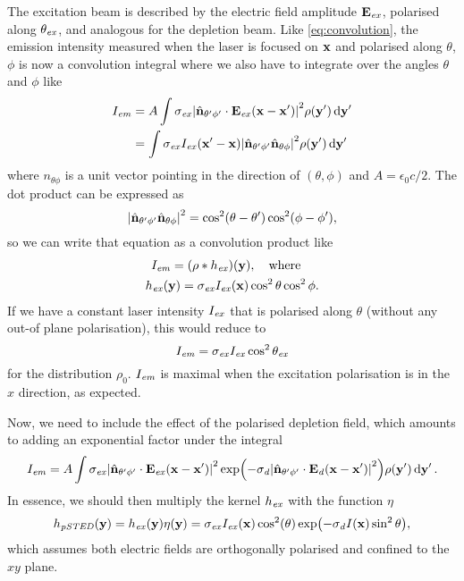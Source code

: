 The excitation beam is described by the electric field amplitude $ \vb{E}_{\mathit{ex}} $, polarised along $ \theta_{\mathit{ex}} $, and analogous for the depletion beam. Like \autoref{eq:convolution}, the emission intensity measured when the laser is focused on $ \vb{x} $ and polarised along $ \theta $, $ \phi $ is now a convolution integral where we also have to integrate over the angles $ \theta $ and $ \phi $ like
\begin{equation}
	\begin{aligned}
		I_{\mathit{em}} 
			&= A \int 
				\sigma_{\mathit{ex}} \abs{\hat{\vb{n}}_{\theta'\phi'} \cdot \vb{E}_{\mathit{ex}}(\vb{x}-\vb{x}')}^2 
				\rho(\vb{y}') 
				\dd{\vb{y}'} \\
			&= \int 
				\sigma_{\mathit{ex}} I_{\mathit{ex}}(\vb{x}'-\vb{x}) \abs{\hat{\vb{n}}_{\theta'\phi'}\hat{\vb{n}}_{\theta\phi}}^2
				\rho(\vb{y}') 
				\dd{\vb{y}'}
	\end{aligned}
\end{equation}
where $ \unit{n}_{\theta\phi} $ is a unit vector pointing in the direction of $ (\theta, \phi) $ and $ A = \epsilon_0c/2 $. The dot product can be expressed as
\begin{equation}
	\abs{\hat{\vb{n}}_{\theta'\phi'}\hat{\vb{n}}_{\theta\phi}}^2 = \cos^2(\theta-\theta') \cos^2(\phi-\phi'),
\end{equation}
so we can write that equation as a convolution product like
\begin{gather}
	I_\emm = (\rho*h_\exc)(\vb{y}),\qq{where} \\
	h_\exc(\vb{y}) = \sigma_\exc I_\exc(\vb{x}) \cos^2\theta\cos^2\phi.
\end{gather}
If we have a constant laser intensity $ I_{\mathit{ex}} $ that is polarised along $ \theta $ (without any out-of plane polarisation), this would reduce to
\begin{equation}
	I_{\mathit{em}} = \sigma_{\mathit{ex}} I_{\mathit{ex}} \cos^2\theta_{\mathit{ex}}
\end{equation}
for the distribution $ \rho_0 $. $ I_{\mathit{em}} $ is maximal when the excitation polarisation is in the $ x $ direction, as expected.

Now, we need to include the effect of the polarised depletion field, which amounts to adding an exponential factor under the integral
\begin{equation}
	I_{\mathit{em}} = A \int
		\sigma_{\mathit{ex}} \abs{\hat{\vb{n}}_{\theta'\phi'} \cdot \vb{E}_{\mathit{ex}}(\vb{x}-\vb{x}')}^2  
		\exp(-\sigma_{\mathit{d}} \abs{\hat{\vb{n}}_{\theta'\phi'} \cdot \vb{E}_{\mathit{d}}(\vb{x}-\vb{x}')}^2)
		\rho(\vb{y}') 
		\dd{\vb{y}'}.
	\label{eq:psted integral}
\end{equation}
In essence, we should then multiply the kernel $ h_{\mathit{ex}} $ with the function $ \eta $
\begin{equation}
	h_\mathit{pSTED}(\vb{y}) = h_{\mathit{ex}}(\vb{y}) \eta(\vb{y}) = \sigma_{\mathit{ex}} I_{\mathit{ex}}(\vb{x}) \cos^2(\theta) \exp(-\sigma_{\mathit{d}} I(\vb{x}) \sin^2 \theta),
\end{equation}
which assumes both electric fields are orthogonally polarised and confined to the $ xy $ plane.

